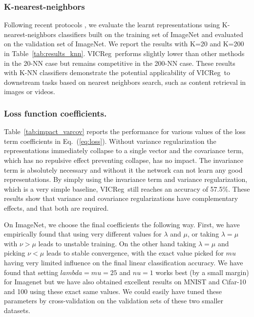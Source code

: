 \documentclass{article}
\newcommand{\algo}{VICReg}
\begin{document}
\subsubsection{K-nearest-neighbors}

Following recent protocols \cite{caron2020swav, wu2018discrimination, zhuang2019local}, we evaluate the learnt representations using K-nearest-neighbors classifiers built on the training set of ImageNet and evaluated on the validation set of ImageNet. We report the results with K=20 and K=200 in Table~\ref{tab:results_knn}. \algo \ performs slightly lower than other methods in the 20-NN case but remains competitive in the 200-NN case. These results with K-NN classifiers demonstrate the potential applicability of \algo \ to downstream tasks based on nearest neighbors search, such as content retrieval in images or videos.

\subsubsection{Loss function coefficients.} \label{app:loss_coeffs}
Table~\ref{tab:impact_varcov} reports the performance for various values of the loss term coefficients in Eq.~(\ref{eq:loss}). Without variance regularization the representations immediately collapse to a single vector and the covariance term, which has no repulsive effect preventing collapse, has no impact. The invariance term is absolutely necessary and without it the network can not learn any good representations. By simply using the invariance term and variance regularization, which is a very simple baseline, \algo \ still reaches an accuracy of 57.5$\%$. These results show that variance and covariance regularizations have complementary effects, and that both are required.

On ImageNet, we choose the final coefficients the following way. First, we have empirically found that using very different values for $\lambda$ and $\mu$, or taking $\lambda=\mu$ with $\nu > \mu$ leads to unstable training. On the other hand taking $\lambda=\mu$ and picking $\nu<\mu$ leads to stable convergence, with the exact value picked for $mu$ having very limited influence on the final linear classification accuracy. We have found that setting $lambda=mu= 25$ and $nu=1$ works best (by a small margin) for Imagenet but we have also obtained excellent results on MNIST and Cifar-10 and 100 using these exact same values. We could easily have tuned these parameters by cross-validation on the validation sets of these two smaller datasets.
\end{document}
